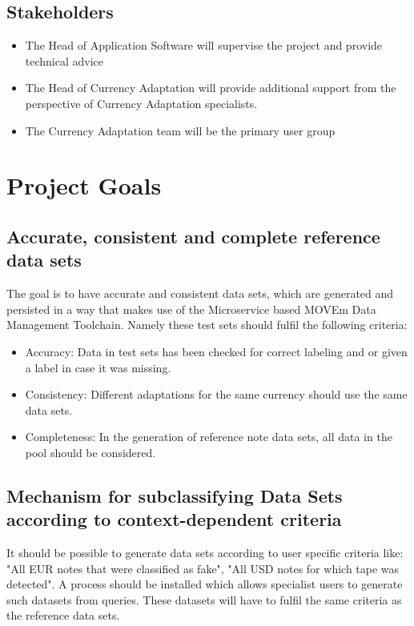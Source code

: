 \subsection{Stakeholders}
\begin{itemize}
\item The Head of Application Software will supervise the project and provide technical advice
\item The Head of Currency Adaptation will provide additional support from the perspective of Currency Adaptation specialists.
\item The Currency Adaptation team will be the primary user group
\end{itemize}

\section{Project Goals}
\label{sec:goals}


\subsection{Accurate, consistent and complete reference data sets}
The goal is to have accurate and consistent data sets, which are generated and persisted in a way that makes use of the Microservice based MOVEm Data Management Toolchain. Namely these test sets should fulfil the following criteria:

\begin{itemize}
\item Accuracy: Data in test sets has been checked for correct labeling and or given a label in case it was missing.
\item Consistency: Different adaptations for the same currency should use the same data sets. 
\item Completeness: In the generation of reference note data sets, all data in the pool should be considered.

\end{itemize}




\subsection{Mechanism for subclassifying Data Sets according to context-dependent criteria}

It should be possible to generate data sets according to user specific criteria like: "All EUR notes that were classified as fake", "All USD notes for which tape was detected". 
A process should be installed which allows specialist users to generate such datasets from queries. These datasets will have to fulfil the same criteria as the reference data sets.

